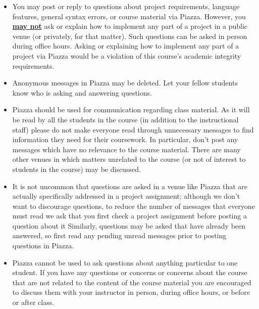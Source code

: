 \documentclass[10pt]{article}
\begin{document}
    \vspace{-1mm}

    \begin{itemize}

      \addtolength{\itemsep}{-.25mm}

      \item You may post or reply to questions about project requirements,
            language features, general syntax errors, or course material via
            Piazza.  However, you \underline{\textbf{may not}} ask or
            explain how to implement any part of a project in a public venue
            (or privately, for that matter).  Such questions can be asked in
            person during office hours.  Asking or explaining how to
            implement any part of a project via Piazza would be a violation
            of this course's academic integrity requirements.

      \item Anonymous messages in Piazza may be deleted.  Let your fellow
            students know who is asking and answering questions.

      \item Piazza should be used for communication regarding class
            material.  As it will be read by all the students in the course
            (in addition to the instructional staff) please do not make
            everyone read through unnecessary messages to find information
            they need for their coursework.  In particular, don't post any
            messages which have no relevance to the course material.  There
            are many other venues in which matters unrelated to the course
            (or not of interest to students in the course) may be discussed.

      \item It is not uncommon that questions are asked in a venue like
            Piazza that are actually specifically addressed in a project
            assignment; although we don't want to discourage questions, to
            reduce the number of messages that everyone must read we ask
            that you first check a project assignment before posting a
            question about it Similarly, questions may be asked that have
            already been answered, so first read any pending unread messages
            prior to posting questions in Piazza.

      \item Piazza cannot be used to ask questions about anything particular
            to one student.  If you have any questions or concerns or
            concerns about the course that are not related to the content of
            the course material you are encouraged to discuss them with your
            instructor in person, during office hours, or before or after
            class.

    \end{itemize}

    \vspace{-2.5mm}
\end{document}
